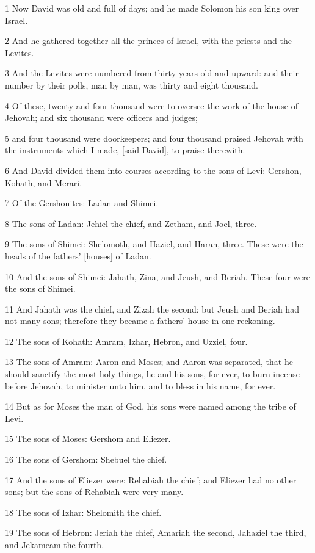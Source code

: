 \par 1 Now David was old and full of days; and he made Solomon his son king over Israel.
\par 2 And he gathered together all the princes of Israel, with the priests and the Levites.
\par 3 And the Levites were numbered from thirty years old and upward: and their number by their polls, man by man, was thirty and eight thousand.
\par 4 Of these, twenty and four thousand were to oversee the work of the house of Jehovah; and six thousand were officers and judges;
\par 5 and four thousand were doorkeepers; and four thousand praised Jehovah with the instruments which I made, [said David], to praise therewith.
\par 6 And David divided them into courses according to the sons of Levi: Gershon, Kohath, and Merari.
\par 7 Of the Gershonites: Ladan and Shimei.
\par 8 The sons of Ladan: Jehiel the chief, and Zetham, and Joel, three.
\par 9 The sons of Shimei: Shelomoth, and Haziel, and Haran, three. These were the heads of the fathers' [houses] of Ladan.
\par 10 And the sons of Shimei: Jahath, Zina, and Jeush, and Beriah. These four were the sons of Shimei.
\par 11 And Jahath was the chief, and Zizah the second: but Jeush and Beriah had not many sons; therefore they became a fathers' house in one reckoning.
\par 12 The sons of Kohath: Amram, Izhar, Hebron, and Uzziel, four.
\par 13 The sons of Amram: Aaron and Moses; and Aaron was separated, that he should sanctify the most holy things, he and his sons, for ever, to burn incense before Jehovah, to minister unto him, and to bless in his name, for ever.
\par 14 But as for Moses the man of God, his sons were named among the tribe of Levi.
\par 15 The sons of Moses: Gershom and Eliezer.
\par 16 The sons of Gershom: Shebuel the chief.
\par 17 And the sons of Eliezer were: Rehabiah the chief; and Eliezer had no other sons; but the sons of Rehabiah were very many.
\par 18 The sons of Izhar: Shelomith the chief.
\par 19 The sons of Hebron: Jeriah the chief, Amariah the second, Jahaziel the third, and Jekameam the fourth.
